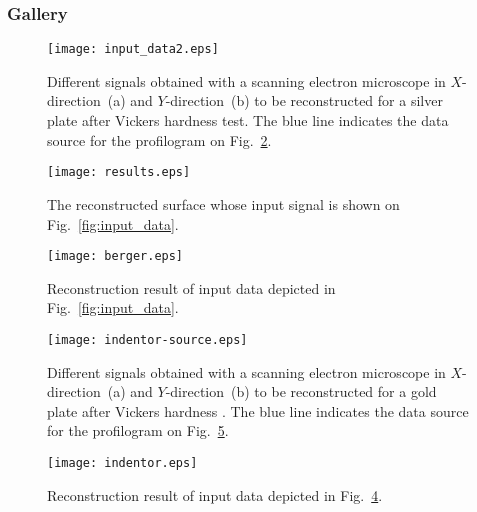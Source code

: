 \documentclass{beamer}
\begin{document}
\begin{frame}[c,allowframebreaks]
    \frametitle{Gallery}

    \begin{figure}
        \texttt{[image: input\_data2.eps]}
        \caption{Different signals obtained with a scanning electron microscope in $X$-direction~(a)
        and $Y$-direction~(b) to be reconstructed for a silver plate after Vickers hardness test.
        The blue line indicates the data source for the profilogram on Fig.~\ref{fig:results}.}
    {\label{fig:input_data2}}%
    \end{figure}

    \begin{figure}[t]
        \texttt{[image: results.eps]}
        \caption{The reconstructed surface whose input signal is shown on  Fig.~\ref{fig:input_data}.}
        {\label{fig:results}}
    \end{figure}

    \begin{figure}
        \texttt{[image: berger.eps]}
        \caption{Reconstruction result of input data depicted in Fig.~\ref{fig:input_data}.}
        {\label{fig:berger}}%
    \end{figure}

\framebreak

    \begin{figure}
        \texttt{[image: indentor-source.eps]}
        \caption{Different signals obtained with a scanning electron microscope in $X$-direction~(a) and $Y$-direction~(b) to be reconstructed for a gold plate after Vickers hardness . The blue line indicates the data source for the profilogram on Fig.~\ref{fig:indentor}.}
        {\label{fig:indentor-source}}%
    \end{figure}

\framebreak

    \begin{figure}
        \texttt{[image: indentor.eps]}
        \caption{Reconstruction result of input data depicted in Fig.~\ref{fig:indentor-source}.}
        {\label{fig:indentor}}%
    \end{figure}

\end{frame}
\end{document}
